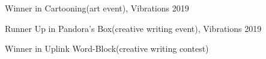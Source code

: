 \begin{zitemize}

\setlength\itemsep{0.5em}

\item Winner in Cartooning(art event), Vibrations 2019

\item Runner Up in Pandora's Box(creative writing event), Vibrations 2019

\item Winner in Uplink Word-Block(creative writing contest)

\end{zitemize}